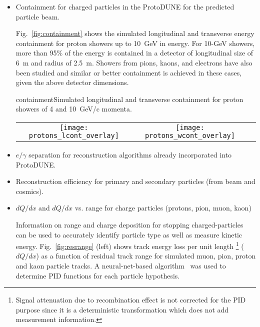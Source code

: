 \begin{itemize}
\item Containment for charged particles in the ProtoDUNE for the predicted particle beam. 

Fig.~\ref{fig:containment} shows the simulated longitudinal and transverse 
energy containment for proton showers up to 10~GeV in energy.
For 10-GeV showers, more than 95\% of the energy is contained in a detector of longitudinal size of 6~m and 
radius of 2.5~m. Showers from pions, kaons, and electrons have also been studied and similar or better containment is achieved in these cases, given the above detector dimensions.


\begin{cdrfigure}{containment}{Simulated longitudinal and transverse containment for proton showers of 4 and 10~GeV/c momenta.}
  \begin{tabular}{ccc}
   \texttt{[image: protons\_lcont\_overlay]}&
   \texttt{[image: protons\_wcont\_overlay]}\\
  \end{tabular}
\end{cdrfigure}


\item $e/\gamma$ separation for reconstruction algorithms already incorporated into ProtoDUNE.
\item Reconstruction efficiency for primary and secondary particles (from beam and cosmics).
\item $dQ/dx$ and $dQ/dx$ vs. range for charge particles (protons, pion, muon, kaon)

Information on range and charge deposition for stopping charged-particles can be used to 
accurately identify particle type as well as measure kinetic energy. 
Fig.~\ref{fig:resrange}  (left) shows track energy loss per unit length \footnote{Signal attenuation due to recombination effect is not corrected for the PID purpose since it is a deterministic transformation which does not add measurement information.}
($dQ/dx$) as a function of residual 
track range for simulated muon, pion, proton and kaon particle tracks. 
A neural-net-based algorithm~\cite{nn_pid,rd_pid}
was used to determine PID functions for each particle hypothesis.


\end{itemize}
